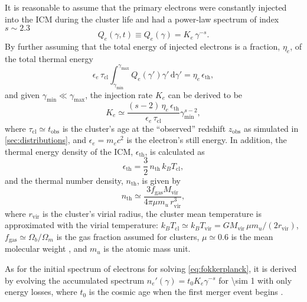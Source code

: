 \documentclass[modern]{aastex62}
\newcommand{\R}[1]{\mathrm{#1}}
\newcommand{\D}[1]{\R{d} #1}
\begin{document}
It is reasonable to assume that the primary electrons were constantly
injected into the ICM during the cluster life and had a power-law
spectrum of index $s \sim 2.3$ \citep[e.g.,][]{sarazin1999}
\begin{equation}
  \label{eq:electron-inj}
  Q_e(\gamma, t) \equiv Q_e(\gamma) = K_e \,\gamma^{-s}.
\end{equation}
By further assuming that the total energy of injected electrons is a
fraction, $\eta_e$, of the total thermal energy \citep{cassano2005}
\begin{equation}
  \epsilon_e \,\tau_{\R{cl}} \int_{\gamma_{\R{min}}}^{\gamma_{\R{max}}}
  Q_e(\gamma') \gamma' \,\D{\gamma'}
  = \eta_e \,\epsilon_{\R{th}},
\end{equation}
and given $\gamma_{\R{min}} \ll \gamma_{\R{\max}}$,
the injection rate $K_e$ can be derived to be
\begin{equation}
  \label{eq:injrate}
  K_e \simeq \frac{(s-2)\,\eta_e\,\epsilon_{\R{th}}}{\epsilon_e\,\tau_{\R{cl}}}
    \gamma_{\R{min}}^{s-2},
\end{equation}
where $\tau_{\R{cl}} \simeq t_{\R{obs}}$ is the cluster's age at the
\enquote{observed} redshift $z_{\R{obs}}$ as simulated in \autoref{sec:distributions},
and $\epsilon_e = m_e c^2$ is the electron's still energy.
In addition, the thermal energy density of the ICM, $\epsilon_{\R{th}}$,
is calculated as
\begin{equation}
  \label{eq:energy-density-thermal}
  \epsilon_{\R{th}} = \frac{3}{2} \,n_{\R{th}} \,k_BT_{\R{cl}},
\end{equation}
and the thermal number density, $n_{\R{th}}$, is given by
\begin{equation}
  \label{eq:number-density-thermal}
  n_{\R{th}} \simeq \frac{3 f_{\R{gas}} M_{\R{vir}}}{4\pi \mu m_u \,r^3_{\R{vir}}},
\end{equation}
where
$r_{\R{vir}}$ is the cluster's virial radius,
the cluster mean temperature is approximated with the virial temperature:
$k_BT_{\R{cl}} \simeq k_BT_{\R{vir}} = G M_{\R{vir}} \,\mu m_u / (2 r_{\R{vir}})$,
$f_{\R{gas}} \simeq \Omega_b/\Omega_m$ is the gas fraction assumed
for clusters, $\mu \simeq 0.6$ is the mean molecular weight
\citep[e.g.,][]{ettori2013}, and $m_u$ is the atomic mass unit.

As for the initial spectrum of electrons for solving
\autoref{eq:fokkerplanck}, it is derived by evolving the accumulated spectrum
$n_e'(\gamma) = t_0 K_e \gamma^{-s}$ for \SI{\sim 1}{\Gyr} with only energy
losses, where $t_0$ is the cosmic age when the first merger event begins
\citep[e.g.,][]{brunetti2007}.
\end{document}
